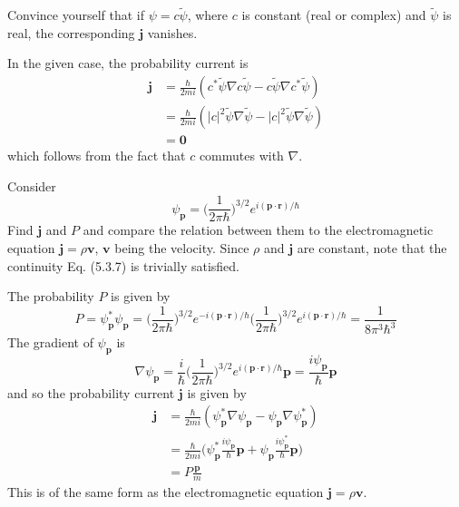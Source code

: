 \documentclass[../principles-of-quantum-mechanics.tex]{subfiles}
\begin{document}
\begin{questions}
	\question Convince yourself that if $\psi = c\tilde{\psi}$, where $c$ is constant (real or complex) and $\tilde{\psi}$ is real, the corresponding $\mathbf{j}$ vanishes.
	
	\begin{solution}
		In the given case, the probability current is
		\begin{align*}
			\mathbf{j} &= \frac{\hbar}{2mi}(c^*\tilde{\psi}\nabla c\tilde{\psi} - c\tilde{\psi}\nabla c^*\tilde{\psi}) \\
			&= \frac{\hbar}{2mi}(|c|^2\tilde{\psi}\nabla\tilde{\psi} - |c|^2\tilde{\psi}\nabla\tilde{\psi}) \\
			&= \boldsymbol{0}
		\end{align*}
		which follows from the fact that $c$ commutes with $\nabla$.
	\end{solution}
	
	\question Consider
	$$\psi_{\mathbf{p}} = \Big(\frac{1}{2\pi\hbar}\Big)^{3/2}e^{i(\mathbf{p}\cdot\mathbf{r})/\hbar}$$
	Find $\mathbf{j}$ and $P$ and compare the relation between them to the electromagnetic equation $\mathbf{j} = \rho\mathbf{v}$, $\mathbf{v}$ being the velocity. Since $\rho$ and $\mathbf{j}$ are constant, note that the continuity Eq. (5.3.7) is trivially satisfied.
	
	\begin{solution}
		The probability $P$ is given by
		$$P = \psi^*_{\mathbf{p}}\psi_{\mathbf{p}} = \Big(\frac{1}{2\pi\hbar}\Big)^{3/2}e^{-i(\mathbf{p}\cdot\mathbf{r})/\hbar}\Big(\frac{1}{2\pi\hbar}\Big)^{3/2}e^{i(\mathbf{p}\cdot\mathbf{r})/\hbar} = \frac{1}{8\pi^3\hbar^3}$$
		The gradient of $\psi_{\mathbf{p}}$ is
		$$\nabla\psi_{\mathbf{p}} = \frac{i}{\hbar}\Big(\frac{1}{2\pi\hbar}\Big)^{3/2}e^{i(\mathbf{p}\cdot\mathbf{r})/\hbar}\mathbf{p} = \frac{i\psi_{\mathbf{p}}}{\hbar}\mathbf{p}$$
		and so the probability current $\mathbf{j}$ is given by
		\begin{align*}
			\mathbf{j} &= \frac{\hbar}{2mi}(\psi_{\mathbf{p}}^*\nabla\psi_{\mathbf{p}} - \psi_{\mathbf{p}}\nabla\psi_{\mathbf{p}}^*) \\
			&= \frac{\hbar}{2mi}\Big(\psi_{\mathbf{p}}^*\frac{i\psi_{\mathbf{p}}}{\hbar}\mathbf{p} + \psi_{\mathbf{p}}\frac{i\psi_{\mathbf{p}}^*}{\hbar}\mathbf{p}\Big) \\
			&= P\frac{\mathbf{p}}{m}
		\end{align*}
		This is of the same form as the electromagnetic equation $\mathbf{j} = \rho\mathbf{v}$.
	\end{solution}
	

\end{questions}
\end{document}
